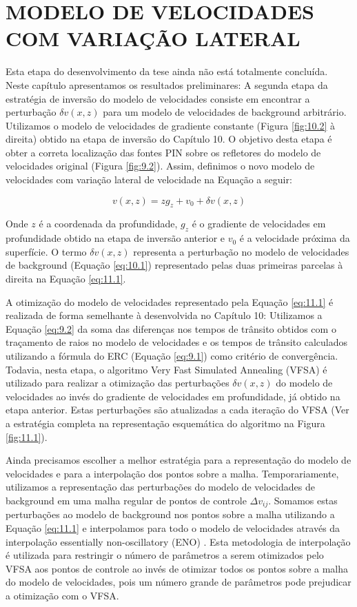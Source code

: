\chapter{MODELO DE VELOCIDADES COM VARIAÇÃO LATERAL}
\label{cap11}

Esta etapa do desenvolvimento da tese ainda não está totalmente concluída. Neste capítulo apresentamos
os resultados preliminares:
A segunda etapa da estratégia de inversão do modelo de velocidades consiste em encontrar a perturbação
$\delta v(x,z)$ para um modelo de velocidades de background arbitrário.
Utilizamos o modelo de velocidades de gradiente constante (Figura \ref{fig:10.2} à direita)
obtido na etapa de inversão do Capítulo 10. O objetivo desta etapa é obter a correta 
localização das fontes PIN sobre os refletores do modelo de velocidades original (Figura \ref{fig:9.2}).
Assim, definimos o novo modelo de velocidades com variação lateral de velocidade na
Equação a seguir:

\begin{equation}
\label{eq:11.1}
v(x,z)=z g_z+v_0+\delta v(x,z)
\end{equation}

Onde $z$ é a coordenada da profundidade, $g_z$ é o gradiente de velocidades em profundidade obtido na
etapa de inversão anterior e $v_0$ é a velocidade próxima da superfície. O termo $\delta v(x,z)$ representa
a perturbação no modelo de velocidades de background (Equação \ref{eq:10.1})
representado pelas duas primeiras parcelas à direita na 
Equação \ref{eq:11.1}.

A otimização do modelo de velocidades
representado pela Equação \ref{eq:11.1}
é realizada de forma semelhante à desenvolvida no Capítulo 10:
Utilizamos a Equação \ref{eq:9.2} da soma das diferenças nos tempos de trânsito obtidos com o traçamento de raios no modelo de velocidades e os tempos de trânsito calculados utilizando a fórmula do ERC
(Equação \ref{eq:9.1}) como critério de convergência.
Todavia, nesta etapa, o algoritmo Very Fast Simulated Annealing (VFSA) é utilizado para realizar a otimização das perturbações $\delta v(x,z)$ do modelo de velocidades ao invés do gradiente de velocidades em
profundidade, já obtido na etapa anterior. Estas perturbações são atualizadas a cada iteração do VFSA (Ver a estratégia completa na representação esquemática do algoritmo na Figura \ref{fig:11.1}).

Ainda precisamos escolher a melhor estratégia para a representação do modelo de velocidades
e para a interpolação dos pontos sobre a malha. Temporariamente, utilizamos a representação
das perturbações do modelo de velocidades de background em uma malha regular de pontos de
controle $\Delta v_{ij}$. Somamos estas perturbações ao modelo de background nos pontos sobre
a malha utilizando a Equação \ref{eq:11.1} e interpolamos para todo o modelo de velocidades
através da interpolação essentially non-oscillatory (ENO) \cite{eno1,eno2}. Esta metodologia
de interpolação é utilizada para restringir o número de parâmetros a serem otimizados pelo VFSA
aos pontos de controle ao invés de otimizar todos os pontos sobre a malha do modelo de velocidades,
pois um número grande de parâmetros pode prejudicar a otimização com o VFSA.

